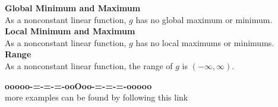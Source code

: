 \documentclass{ximera}
\begin{document}
\begin{example}
\textbf{Global Minimum and Maximum} \\

As a nonconstant linear function, $g$ has no global maximum or minimum. \\



\textbf{Local Minimum and Maximum} \\

As a nonconstant linear function, $g$ has no local maximums or minimums. \\



\textbf{Range} \\

As a nonconstant linear function, the range of $g$ is $(-\infty, \infty)$. \\



\end{example}




\begin{center}
\textbf{\textcolor{green!50!black}{ooooo-=-=-=-ooOoo-=-=-=-ooooo}} \\

more examples can be found by following this link\\ 

\end{center}
\end{document}
